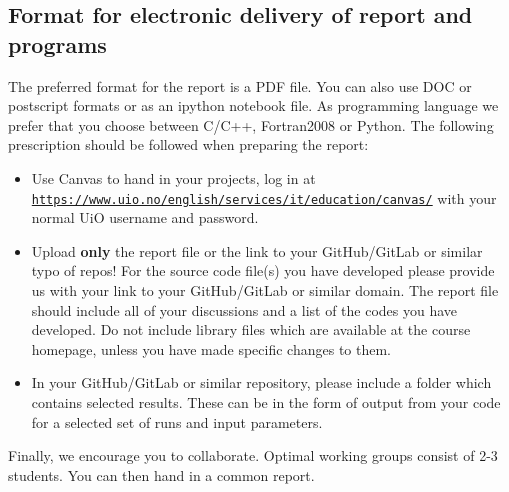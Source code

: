 \documentclass[%
oneside,                 %
final,                   %
10pt]{article}
\begin{document}
\noindent
\subsection*{Format for electronic delivery of report and programs}

The preferred format for the report is a PDF file. You can also use DOC or postscript formats or as an ipython notebook file.  As programming language we prefer that you choose between C/C++, Fortran2008 or Python. The following prescription should be followed when preparing the report:

\begin{itemize}
  \item Use Canvas to hand in your projects, log in  at  \href{{https://www.uio.no/english/services/it/education/canvas/}}{\nolinkurl{https://www.uio.no/english/services/it/education/canvas/}} with your normal UiO username and password.

  \item Upload \textbf{only} the report file or the link to your GitHub/GitLab or similar typo of  repos!  For the source code file(s) you have developed please provide us with your link to your GitHub/GitLab or similar  domain.  The report file should include all of your discussions and a list of the codes you have developed.  Do not include library files which are available at the course homepage, unless you have made specific changes to them.

  \item In your GitHub/GitLab or similar repository, please include a folder which contains selected results. These can be in the form of output from your code for a selected set of runs and input parameters.
\end{itemize}

\noindent
Finally, 
we encourage you to collaborate. Optimal working groups consist of 
2-3 students. You can then hand in a common report. 


\end{document}
